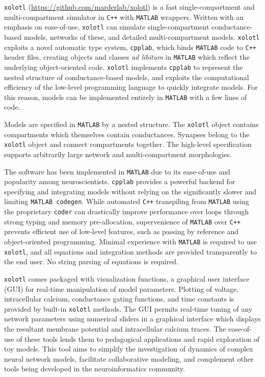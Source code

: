 \documentclass{frontiersSCNS} %
\begin{document}
\texttt{xolotl} (\url{https://github.com/marderlab/xolotl}) is a fast single-compartment and multi-compartment simulator in \texttt{C++} with \texttt{MATLAB} wrappers. Written with an emphasis on ease-of-use, \texttt{xolotl} can simulate single-compartment conductance-based models, networks of these, and detailed multi-compartment models. \texttt{xolotl} exploits a novel automatic type system, \texttt{cpplab}, which binds \texttt{MATLAB} code to \texttt{C++} header files, creating objects and classes \textit{ad libitum} in \texttt{MATLAB} which reflect the underlying object-oriented code. \texttt{xolotl} implements \texttt{cpplab} to represent the nested structure of conductance-based models, and exploits the computational efficiency of the low-level programming language to quickly integrate models. For this reason, models can be implemented entirely in \texttt{MATLAB} with a few lines of code.

Models are specified in \texttt{MATLAB} by a nested structure. The \texttt{xolotl} object contains compartments which themselves contain conductances. Synapses belong to the \texttt{xolotl} object and connect compartments together. The high-level specification supports arbitrarily large network and multi-compartment morphologies. 


The software has been implemented in \texttt{MATLAB} due to its ease-of-use and popularity among neuroscientists. \texttt{cpplab} provides a powerful backend for specifying and integrating models without relying on the significantly slower and limiting \texttt{MATLAB codegen}. While automated \texttt{C++} transpiling from \texttt{MATLAB} using the proprietary \texttt{coder} can drastically improve performance over loops through strong typing and memory pre-allocation, supervenience of \texttt{MATLAB} over \texttt{C++} prevents efficient use of low-level features, such as passing by reference and object-oriented programming.   Minimal experience with \texttt{MATLAB} is required to use \texttt{xolotl}, and all equations and integration methods are provided transparently to the end user. No string parsing of equations is required. 

\texttt{xolotl} comes packaged with visualization functions, a graphical user interface (GUI) for real-time manipulation of model parameters. Plotting of voltage, intracellular calcium, conductance gating functions, and time constants is provided by built-in \texttt{xolotl} methods. The GUI permits real-time tuning of any network parameters using numerical sliders in a graphical interface which displays the resultant membrane potential and intracellular calcium traces. The ease-of-use of these tools lends them to pedagogical applications and rapid exploration of toy models. This tool aims to simplify the investigation of dynamics of complex neural network models, facilitate collaborative modeling, and complement other tools being developed in the neuroinformatics community.
\end{document}
